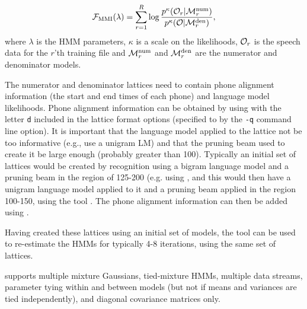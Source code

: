 \newcommand{\num}{{\mathrm{num}}}
\newcommand{\den}{{\mathrm{den}}}
\newcommand{\MMI}{{\mathrm{MMI}}}
\newcommand{\calO}{ {\cal O} }
\newcommand{\calM}{ {\cal M} }

\begin{equation}
    {\cal F}_\MMI(\lambda) = \sum_{r=1}^R \log \frac {  p^\kappa(\calO_r | \calM^\num_r) } { p^\kappa(\calO | \calM^\den_r) },
  \label{eq:mmimodels}
\end{equation}
where $\lambda$ is the HMM parameters,  $\kappa$ is a scale on the likelihoods, $\calO_r$ is the
speech data for the $r$'th training file and $\calM^\num_r$ and $\calM^\den_r$ are the numerator
and denominator models.  

The numerator and denominator lattices need to contain phone alignment information
(the start and end times of each phone) and language model likelihoods.
Phone alignment information can be obtained by using  with
the letter \texttt{d} included in the lattice format options (specified to  by the
\texttt{-q} command line option).  It is important that the language model
applied to the lattice not be too informative (e.g., use a unigram LM) and that the
pruning beam used to create it be large enough (probably greater than 100).
Typically an initial set of lattices would be created by recognition using
a bigram language model and a pruning beam in the region of 125-200
(e.g. using , and this would then have a unigram language
model applied to it and a pruning beam applied in the region 100-150, using
the tool .   The phone alignment information
can then be added using .

Having created these lattices using an initial set of models, the
tool  can be used to re-estimate the HMMs for 
typically 4-8 iterations, using the same set of lattices.   

 supports multiple mixture Gaussians, tied-mixture
HMMs, multiple data streams, parameter tying within and between models
(but not if means and variances are tied independently), and diagonal
covariance matrices only.






